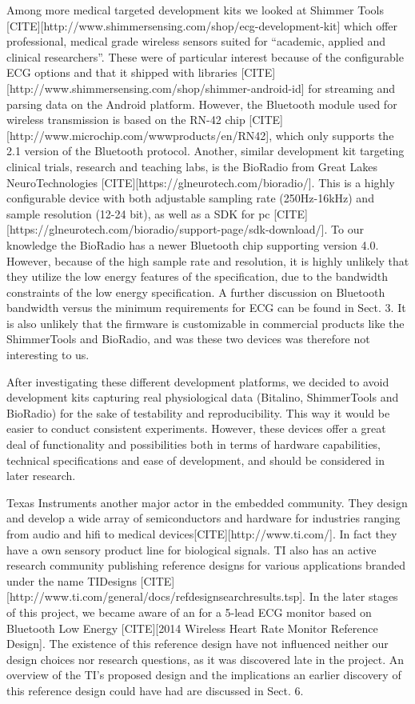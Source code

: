 Among more medical targeted development kits we looked at Shimmer Tools [CITE][http://www.shimmersensing.com/shop/ecg-development-kit] which offer professional, medical grade wireless sensors suited for ``academic, applied and clinical researchers''. These were of particular interest because of the configurable ECG options and that it shipped with libraries [CITE][http://www.shimmersensing.com/shop/shimmer-android-id] for streaming and parsing data on the Android platform. However, the Bluetooth module used for wireless transmission is based on the RN-42 chip [CITE][http://www.microchip.com/wwwproducts/en/RN42], which only supports the 2.1 version of the Bluetooth protocol. Another, similar development kit targeting clinical trials, research and teaching labs, is the BioRadio from Great Lakes NeuroTechnologies [CITE][https://glneurotech.com/bioradio/]. This is a highly configurable device with both adjustable sampling rate (250Hz-16kHz) and sample resolution (12-24 bit), as well as a SDK for pc [CITE][https://glneurotech.com/bioradio/support-page/sdk-download/]. To our knowledge the BioRadio has a newer Bluetooth chip supporting version 4.0. However, because of the high sample rate and resolution, it is highly unlikely that they utilize the low energy features of the specification, due to the bandwidth constraints of the low energy specification. A further discussion on Bluetooth bandwidth versus the minimum requirements for ECG can be found in Sect. 3. It is also unlikely that the firmware is customizable in commercial products like the ShimmerTools and BioRadio, and was these two devices was therefore not interesting to us.

After investigating these different development platforms, we decided to avoid development kits capturing real physiological data (Bitalino, ShimmerTools and BioRadio) for the sake of testability and reproducibility. This way it would be easier to conduct consistent experiments. However, these devices offer a great deal of functionality and possibilities both in terms of hardware capabilities, technical specifications and ease of development, and should be considered in later research.

Texas Instruments another major actor in the embedded community. They design and develop a wide array of semiconductors and hardware for industries ranging from audio and hifi to medical devices[CITE][http://www.ti.com/]. In fact they have a own sensory product line for biological signals. TI also has an active research community publishing reference designs for various applications branded under the name TIDesigns [CITE][http://www.ti.com/general/docs/refdesignsearchresults.tsp]. In the later stages of this project, we became aware of an for a 5-lead ECG monitor based on Bluetooth Low Energy [CITE][2014 Wireless Heart Rate Monitor Reference Design]. The existence of this reference design have not influenced neither our design choices nor research questions, as it was discovered late in the project. An overview of the TI's proposed design and the implications an earlier discovery of this reference design could have had are discussed in Sect. 6.


